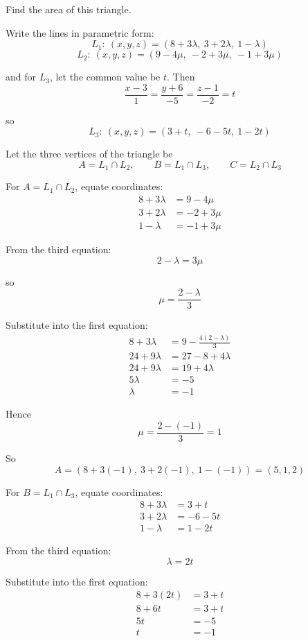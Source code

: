 \documentclass[leqno]{article}
\begin{document}
\begin{enumerate}[
  label=\textbf{\arabic*.},
  leftmargin=*,
  topsep=0pt,
  partopsep=0pt,
  parsep=0pt
]
Find the area of this triangle. 

\vspace*{10pt}

\begin{djsSolution}
Write the lines in parametric form:
\[
L_1:\ (x,y,z)=(8+3\lambda,\ 3+2\lambda,\ 1-\lambda)
\]
\[
L_2:\ (x,y,z)=(9-4\mu,\ -2+3\mu,\ -1+3\mu)
\]

and for \(L_3\), let the common value be \(t\). Then
\[
\frac{x-3}{1}=\frac{y+6}{-5}=\frac{z-1}{-2}=t
\]

so
\[
L_3:\ (x,y,z)=(3+t,\ -6-5t,\ 1-2t)
\]

Let the three vertices of the triangle be
\[
A=L_1\cap L_2,\qquad B=L_1\cap L_3,\qquad C=L_2\cap L_3
\]

For \(A=L_1\cap L_2\), equate coordinates:
\begin{align*}
8+3\lambda&=9-4\mu \\
3+2\lambda&=-2+3\mu \\
1-\lambda&=-1+3\mu
\end{align*}

From the third equation:
\[
2-\lambda=3\mu
\]

so
\[
\mu=\frac{2-\lambda}{3}
\]

Substitute into the first equation:
\begin{align*}
8+3\lambda&=9-\frac{4(2-\lambda)}{3} \\
24+9\lambda&=27-8+4\lambda \\
24+9\lambda&=19+4\lambda \\
5\lambda&=-5 \\
\lambda&=-1
\end{align*}

Hence
\[
\mu=\frac{2-(-1)}{3}=1
\]

So
\[
A=(8+3(-1),\ 3+2(-1),\ 1-(-1))=(5,1,2)
\]

For \(B=L_1\cap L_3\), equate coordinates:
\begin{align*}
8+3\lambda&=3+t \\
3+2\lambda&=-6-5t \\
1-\lambda&=1-2t
\end{align*}

From the third equation:
\[
\lambda=2t
\]

Substitute into the first equation:
\begin{align*}
8+3(2t)&=3+t \\
8+6t&=3+t \\
5t&=-5 \\
t&=-1
\end{align*}


\end{djsSolution}
\end{enumerate}
\end{document}
